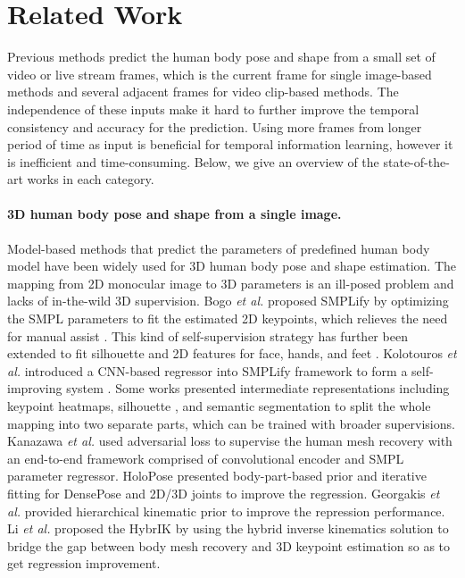 \documentclass[10pt,twocolumn,letterpaper]{article}
\begin{document}
\section{Related Work}
Previous methods predict the human body pose and shape from a small set of video or live stream frames, which is the current frame for single image-based methods and several adjacent frames for video clip-based methods. The independence of these inputs make it hard to further improve the temporal consistency and accuracy for the prediction. Using more frames from longer period of time as input is beneficial for temporal information learning, however it is inefficient and time-consuming. Below, we give an overview of the state-of-the-art works in each category.

\paragraph{3D human body pose and shape from a single image.}
Model-based methods that predict the parameters of predefined human body model \cite{anguelov2005scape,loper2015smpl,pavlakos2019expressive,yang2021s3} have been widely used for 3D human body pose and shape estimation. The mapping from 2D monocular image to 3D parameters is an ill-posed problem and lacks of in-the-wild 3D supervision. Bogo \textit{et al.} \cite{bogo2016keep} proposed SMPLify by optimizing the SMPL parameters to fit the estimated 2D keypoints, which relieves the need for manual assist \cite{guan2009estimating}. This kind of self-supervision strategy has further been extended to fit silhouette \cite{tan2017indirect,lassner2017unite} and 2D features for face, hands, and feet \cite{pavlakos2019expressive}. Kolotouros \textit{et al.} introduced a CNN-based regressor into SMPLify framework to form a self-improving system \cite{kolotouros2019learning}. Some works presented intermediate representations including keypoint heatmaps, silhouette \cite{pavlakos2018learning}, and semantic segmentation \cite{omran2018neural} to split the whole mapping into two separate parts, which can be trained with broader supervisions. Kanazawa \textit{et al.} \cite{kanazawa2018end} used adversarial loss to supervise the human mesh recovery with an end-to-end framework comprised of convolutional encoder and SMPL parameter regressor.
HoloPose \cite{guler2019holopose} presented body-part-based prior and iterative fitting for DensePose \cite{guler2018densepose} and 2D/3D joints to improve the regression. Georgakis \textit{et al.} \cite{georgakis2020hierarchical} provided hierarchical kinematic prior to improve the repression performance. Li \textit{et al.} proposed the HybrIK \cite{li2021hybrik} by using the hybrid inverse kinematics solution to bridge the gap between body mesh recovery and 3D keypoint estimation so as to get regression improvement.
\end{document}
